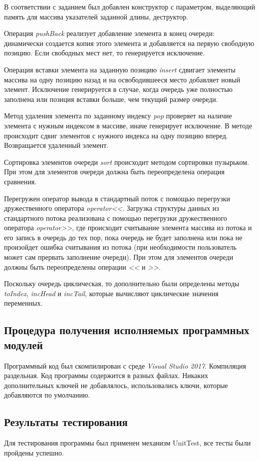 \documentclass[a4paper,14pt]{article}
\begin{document}
В соответствии с заданием был добавлен конструктор с параметром, выделяющий память для массива указателей заданной длины, деструктор.

Операция \textit{pushBack} реализует добавление элемента в конец очереди: динамически создается копия этого элемента и добавляется на первую свободную позицию. Если свободных мест нет, то генерируется исключение.

Операция вставки элемента на заданную позицию \textit{insert} сдвигает элементы массива на одну позицию назад и на освободившееся место добавляет новый элемент. Исключение генерируется  в случае, когда очередь уже полностью заполнена или позиция вставки больше, чем текущий размер очереди.

Метод удаления элемента по заданному индексу \textit{pop} проверяет на наличие элемента с нужным индексом в массиве, иначе генерирует исключение. В методе происходит сдвиг элементов с нужного индекса на одну позицию вперед. Возвращается удаленный элемент.

Сортировка элементов очереди \textit{sort} происходит методом сортировки пузырьком. При этом для элементов очереди должна быть переопределена операция сравнения.

Перегружен оператор вывода в стандартный поток с помощью перегрузки дружественного оператора \textit{operator<<}.
Загрузка структуры данных из стандартного потока реализована с помощью перегрузки дружественного оператора \textit{operator>>}, где происходит считывание элемента массива из потока и его запись в очередь до тех пор, пока очередь не будет заполнена или пока не произойдет ошибка считывания из потока (при необходимости пользователь может сам прервать заполнение очереди). При этом для элементов очереди должны быть переопределены операции \textit{<<} и \textit{>>}.

Поскольку очередь циклическая, то дополнительно были определены методы \textit{toIndex}, \textit{incHead} и \textit{incTail}, которые вычисляют циклические значения переменных.

\subsection{Процедура получения исполняемых программных модулей}
Программный код был скомпилирован с среде \textit{Visual Studio 2017}. Компиляция раздельная. Код программы содержится в разных файлах. Никаких дополнительных ключей не добавлялось, использовались ключи, которые добавляются по умолчанию.
\subsection{Результаты тестирования}
Для тестирования программы был применен механизм UnitTest, все тесты были пройдены успешно.
\newpage
\setcounter{figure}{1} 
\setcounter{section}{1} 
\setcounter{subsection}{1} 
\end{document}
